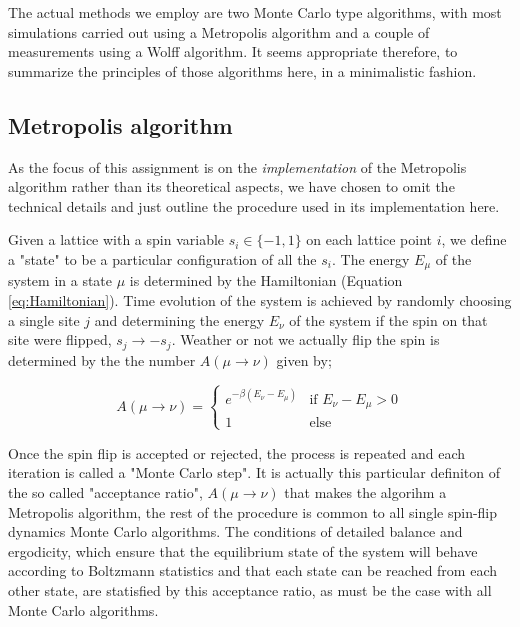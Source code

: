 \documentclass[11pt,a4paper]{article}
\begin{document}
 The actual methods we employ are two Monte Carlo type algorithms, with most simulations carried out using a 
 Metropolis algorithm and a couple of measurements using a Wolff algorithm. It seems appropriate therefore, to summarize the
 principles of those algorithms here, in a minimalistic fashion.

\subsection{Metropolis algorithm}
As the focus of this assignment is on the \textit{implementation} of the Metropolis algorithm rather than its theoretical
 aspects, we have chosen to omit the technical details and just outline the procedure used in its implementation here.

 Given a
 lattice with a spin variable $s_i \in \{-1,1\}$ on each lattice point $i$, we define a "state" to be a particular
 configuration of all the ${s_i}$. The energy $E_\mu$ of the system in a state $\mu$ is determined by the Hamiltonian
 (Equation \ref{eq:Hamiltonian}). Time evolution of the system is achieved by randomly choosing a single site $j$ and determining
 the energy $E_\nu$ of the system if the spin on that site were flipped, $s_j \rightarrow -s_j$. Weather or not we actually flip
 the spin is determined by the the number $A(\mu \rightarrow \nu)$ given by;


\begin{equation}\label{eq:A-ratio}
    A(\mu \rightarrow \nu) = \begin{cases}
        e^{-\beta (E_\nu - E_\mu)} & \mbox{if} \,\,  E_\nu - E_\mu > 0 \\
        1 & \mbox{else}
    \end{cases}
\end{equation}

Once the spin flip is accepted or rejected, the process is repeated and each iteration is called a "Monte Carlo step". It is actually
 this particular definiton of the so called
 "acceptance ratio", $A(\mu \rightarrow \nu)$ that makes the algorihm a Metropolis algorithm,
 the rest of the procedure is common to all single spin-flip dynamics Monte Carlo algorithms. The conditions
 of detailed balance and ergodicity, which ensure that the
 equilibrium state of the system will behave according to Boltzmann statistics and that each state can be reached from each other state, are
 statisfied by this acceptance ratio, as must be the case with all Monte Carlo algorithms.
\end{document}
